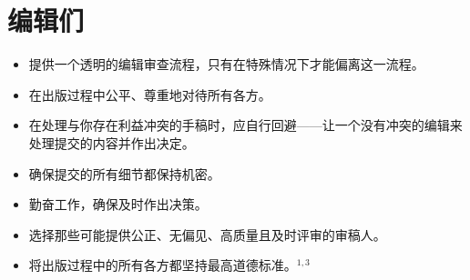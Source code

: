 \section*{编辑们
}
\begin{itemize}
\item 提供一个透明的编辑审查流程，只有在特殊情况下才能偏离这一流程。
\item 在出版过程中公平、尊重地对待所有各方。
\item 在处理与你存在利益冲突的手稿时，应自行回避——让一个没有冲突的编辑来处理提交的内容并作出决定。
\item 确保提交的所有细节都保持机密。
\item 勤奋工作，确保及时作出决策。
\item 选择那些可能提供公正、无偏见、高质量且及时评审的审稿人。
\item 将出版过程中的所有各方都坚持最高道德标准。${ }^{1,3}$

\end{itemize}

